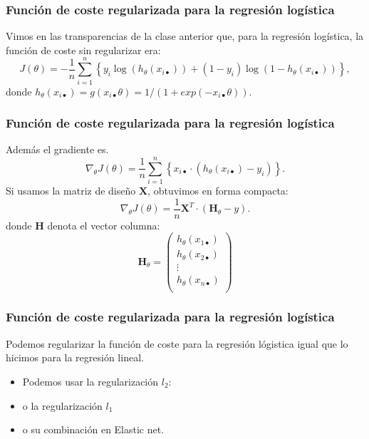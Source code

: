 \documentclass{beamer}
\begin{document}
\begin{frame}\frametitle{Función de coste regularizada para la regresión logística}
Vimos en las transparencias de la clase anterior que, para la regresión logística, la función de coste sin regularizar era:
    $$J(\theta)=- \frac 1 n\sum_{i=1}^n \left\{y_i\log(h_\theta(x_{i\bullet}))+(1-y_i)\log(1-h_\theta(x_{i\bullet}))\right\},$$
donde $h_\theta(x_{i\bullet})=g(x_{i\bullet}\theta)=1/(1+exp(-x_{i\bullet}\theta)).$
\end{frame}

    \begin{frame}\frametitle{Función de coste regularizada para la regresión logística}
Además el gradiente es.
$$    \nabla_\theta J(\theta)= \frac 1 n\sum_{i=1}^n \left\{x_{i\bullet}\cdot (h_\theta(x_{i\bullet})-y_i)\right\}.$$
Si usamos la matriz de diseño $\mathbf{X}$,   obtuvimos  en forma compacta:
$$    \nabla_\theta J(\theta)=\frac 1  n \mathbf{X}^T\cdot\left(\mathbf{H}_\theta-y\right).$$
 donde $\mathbf{H}$ denota el vector columna:
$$\mathbf{H}_\theta=\left(
\begin{array}{l}
  h_\theta(x_{1\bullet})\\
  h_\theta(x_{2\bullet})\\
  \vdots\\
  h_\theta(x_{n\bullet})\\
\end{array}\right)$$

\end{frame}

              \begin{frame}\frametitle{Función de coste regularizada para la regresión logística}
   \begin{overlayarea}{\textwidth}{8cm} 
   Podemos regularizar la función de coste para la regresión lógistica
   igual que lo hicimos para la regresión lineal.\footnotesize
   \begin{itemize}
   \item Podemos usar la regularización $l_2$:
   \end{itemize}
   \begin{center}
\end{center} 
\begin{itemize}
\item o la regularización $l_1$
\end{itemize}
\begin{center}
\end{center}
\begin{itemize}
\item<4-> o su combinación en Elastic net.
\end{itemize}
 
\end{overlayarea}
   
\end{frame}
\end{document}
